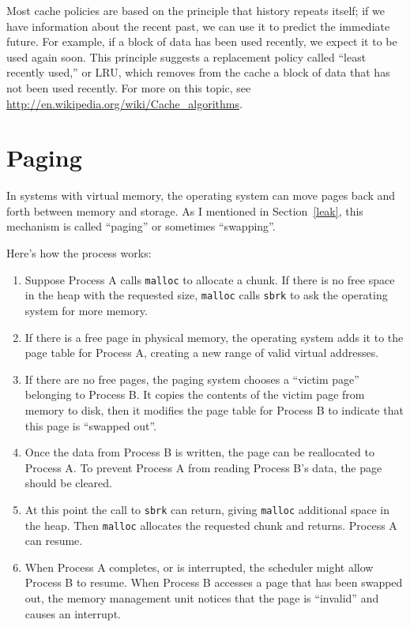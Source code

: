 \documentclass[12pt]{book}
\begin{document}
{Most cache policies are based on the principle that history repeats
itself; if we have information about the recent past, we can use it to
predict the immediate future.  For example, if a block of data has
been used recently, we expect it to be used again soon.  This
principle suggests a replacement policy called ``least recently
used,'' or LRU, which removes from the cache a block of data that
has not been used recently.  For more on this topic, see
\url{http://en.wikipedia.org/wiki/Cache_algorithms}.


\section{Paging}
\label{paging}

In systems with virtual memory, the operating system can move
pages back and forth between memory and storage.  As I mentioned
in Section~\ref{leak}, this mechanism is called ``paging'' or
sometimes ``swapping''.

Here's how the process works:

\begin{enumerate}

\item Suppose Process A calls {\tt malloc} to allocate a chunk.  If there
is no free space in the heap with the requested size, {\tt malloc} calls
{\tt sbrk} to ask the operating system for more memory.

\item If there is a free page in physical memory, the operating system
adds it to the page table for Process A, creating a new range of valid
virtual addresses.

\item If there are no free pages, the paging system chooses a ``victim
page'' belonging to Process B.  It copies the contents of the victim
page from memory to disk, then it modifies the page table for Process
B to indicate that this page is ``swapped out''.

\item Once the data from Process B is written, the page can be reallocated
to Process A.  To prevent Process A from reading Process B's data, the
page should be cleared.

\item At this point the call to {\tt sbrk} can return, giving {\tt malloc}
additional space in the heap.  Then {\tt malloc} allocates the requested
chunk and returns.  Process A can resume.

\item When Process A completes, or is interrupted, the scheduler might
allow Process B to resume.  When Process B accesses a page that has been swapped out, the memory management unit notices that the page is ``invalid'' and causes an interrupt.


\end{enumerate}}
\end{document}
